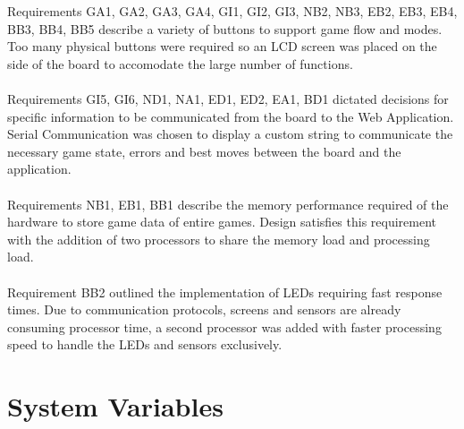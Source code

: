 \documentclass[12pt, titlepage]{article}
\begin{document}
Requirements GA1, GA2, GA3, GA4, GI1, GI2, GI3, NB2, NB3, EB2, EB3, EB4, BB3, BB4, BB5 describe a variety of 
buttons to support game flow and modes. Too many physical buttons were required so an LCD screen was placed on 
the side of the board to accomodate the large number of functions. 
\\ \\
Requirements GI5, GI6, ND1, NA1, ED1, ED2, EA1, BD1 dictated decisions for specific information to be 
communicated from the board to the Web Application. Serial Communication was chosen to display a custom 
string to communicate the necessary game state, errors and best moves between the board and the application. 
\\ \\
Requirements NB1, EB1, BB1 describe the memory performance required of the hardware to store game data of 
entire games. Design satisfies this requirement with the addition of two processors to share the memory load
and processing load.
\\ \\
Requirement BB2 outlined the implementation of LEDs requiring fast response times. Due to communication 
protocols, screens and sensors are already consuming processor time, a second processor was added with faster 
processing speed to handle the LEDs and sensors exclusively.

\section{System Variables}
\end{document}
